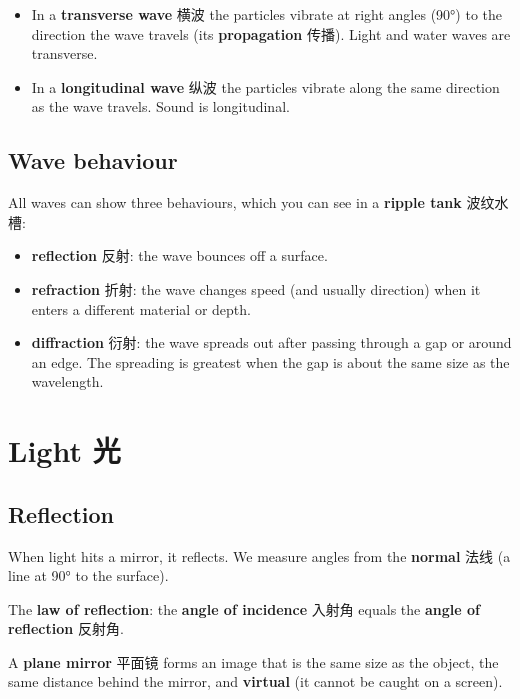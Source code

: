 \documentclass[11pt]{article}
\begin{document}
\begin{itemize}
\item In a \textbf{transverse wave} 横波 the particles vibrate at right angles (90°) to the direction the wave travels (its \textbf{propagation} 传播). Light and water waves are transverse.

\item In a \textbf{longitudinal wave} 纵波 the particles vibrate along the same direction as the wave travels. Sound is longitudinal.

\end{itemize}

\subsection*{Wave behaviour}

All waves can show three behaviours, which you can see in a \textbf{ripple tank} 波纹水槽:

\begin{itemize}
\item \textbf{reflection} 反射: the wave bounces off a surface.

\item \textbf{refraction} 折射: the wave changes speed (and usually direction) when it enters a different material or depth.

\item \textbf{diffraction} 衍射: the wave spreads out after passing through a gap or around an edge. The spreading is greatest when the gap is about the same size as the wavelength.

\end{itemize}

\section*{Light 光}

\subsection*{Reflection}

When light hits a mirror, it reflects. We measure angles from the \textbf{normal} 法线 (a line at 90° to the surface).

The \textbf{law of reflection}: the \textbf{angle of incidence} 入射角 equals the \textbf{angle of reflection} 反射角.

A \textbf{plane mirror} 平面镜 forms an image that is the same size as the object, the same distance behind the mirror, and \textbf{virtual} (it cannot be caught on a screen).
\end{document}
